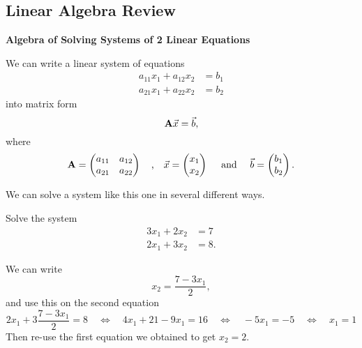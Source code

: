\subsection{Linear Algebra Review}
\label{LinAlg}

\begin{center}\textbf{\color{cyan}Algebra of Solving Systems of 2 Linear Equations} 	
\end{center}

We can write a linear system of equations 
\begin{align*}
a_{11} x_1 + a_{12} x_2 &= b_1 \\
a_{21} x_1 + a_{22} x_2 &= b_2
\end{align*}
into matrix form
$$
{\bf A} \vec{x} = \vec{b},
$$
where
$$
{\bf A} 
	= \begin{pmatrix} 
		a_{11} & a_{12} \\
		a_{21} & a_{22}
	\end{pmatrix}
	\quad \text{,} \quad 
\vec{x}  
	= \begin{pmatrix} 
		x_{1} \\
		x_{2} 
	\end{pmatrix}
	\quad \text{ and } \quad 
\vec{b}  
	= \begin{pmatrix} 
		b_{1} \\
		b_{2} 
	\end{pmatrix} .
$$

We can solve a system like this one in several different ways.

\begin{example}
Solve the system
\begin{align*}
3x_1+2x_2 &= 7 \\
2x_1+3x_2 & = 8.
\end{align*}
\end{example}

\begin{definition} 
We can write
$$
x_2 = \frac{7-3x_1}{2},
$$
and use this on the second equation
$$
2x_1 + 3\frac{7-3x_1}{2} = 8
	\quad \Leftrightarrow \quad 4x_1 + 21-9x_1=16
	\quad \Leftrightarrow \quad -5x_1 =-5
	\quad \Leftrightarrow \quad x_1 =1
$$
Then re-use the first equation we obtained to get $x_2 = 2$.
	
\end{definition}

